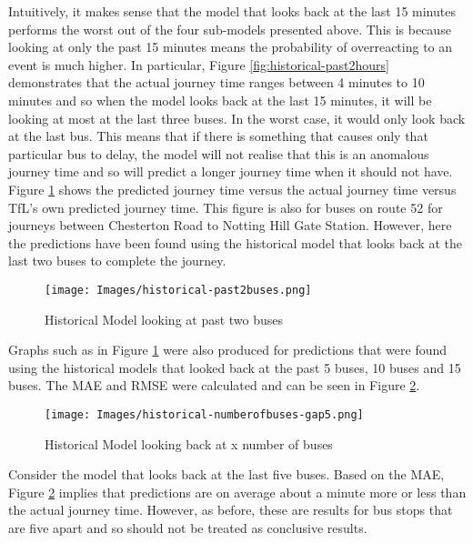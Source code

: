 Intuitively, it makes sense that the model that looks back at the last 15 minutes performs the worst out of the four sub-models presented above. This is because looking at only the past 15 minutes means the probability of overreacting to an event is much higher. In particular, Figure \ref{fig:historical-past2hours} demonstrates that the actual journey time ranges between 4 minutes to 10 minutes and so when the model looks back at the last 15 minutes, it will be looking at most at the last three buses. In the worst case, it would only look back at the last bus. This means that if there is something that causes only that particular bus to delay, the model will not realise that this is an anomalous journey time and so will predict a longer journey time when it should not have. \\

Figure \ref{fig:historical-past2buses} shows the predicted journey time versus the actual journey time versus TfL's own predicted journey time. This figure is also for buses on route 52 for journeys between Chesterton Road to Notting Hill Gate Station. However, here the predictions have been found using the historical model that looks back at the last two buses to complete the journey.

\begin{figure}[H]
\begin{center}
    \texttt{[image: Images/historical-past2buses.png]}
    \caption{Historical Model looking at past two buses}
    \label{fig:historical-past2buses}
\end{center}
\end{figure}

Graphs such as in Figure \ref{fig:historical-past2buses} were also produced for predictions that were found using the historical models that looked back at the past 5 buses, 10 buses and 15 buses. The MAE and RMSE were calculated and can be seen in Figure \ref{fig:historical-lookingbackbuses}.

\begin{figure}[H]
\begin{center}
    \texttt{[image: Images/historical-numberofbuses-gap5.png]}
    \caption{Historical Model looking back at x number of buses}
    \label{fig:historical-lookingbackbuses}
\end{center}
\end{figure}

Consider the model that looks back at the last five buses. Based on the MAE, Figure \ref{fig:historical-lookingbackbuses} implies that predictions are on average about a minute more or less than the actual journey time. However, as before, these are results for bus stops that are five apart and so should not be treated as conclusive results. \\

